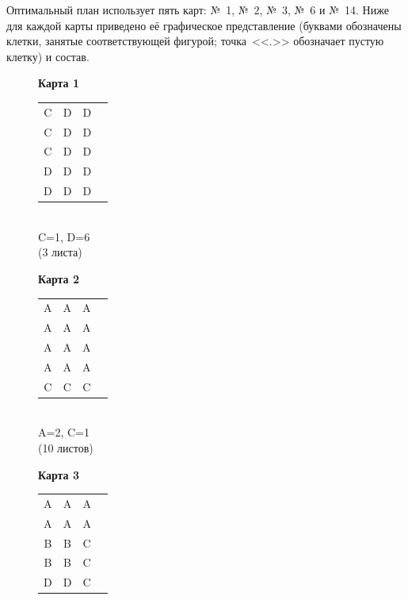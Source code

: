Оптимальный план использует пять карт: №~1, №~2, №~3, №~6 и №~14.
Ниже для каждой карты приведено её графическое представление
(буквами обозначены клетки, занятые соответствующей фигурой;
точка~<<.>> обозначает пустую клетку) и состав.

\clearpage

\begin{figure}[h!]
\centering

\begin{minipage}[t]{0.18\textwidth}
\centering
\textbf{Карта 1}\\[2mm]
{\ttfamily
\begin{tabular}{cccc}
C & D & D & \\
C & D & D & \\
C & D & D & \\
D & D & D & \\
D & D & D & \\
\end{tabular}
}\\[2mm]
\small C=1, D=6\\[1mm]
\small (3 листа)
\end{minipage}\hfill
\begin{minipage}[t]{0.18\textwidth}
\centering
\textbf{Карта 2}\\[2mm]
{\ttfamily
\begin{tabular}{cccc}
A & A & A & \\
A & A & A & \\
A & A & A & \\
A & A & A & \\
C & C & C & \\
\end{tabular}
}\\[2mm]
\small A=2, C=1\\[1mm]
\small (10 листов)
\end{minipage}\hfill
\begin{minipage}[t]{0.18\textwidth}
\centering
\textbf{Карта 3}\\[2mm]
{\ttfamily
\begin{tabular}{cccc}
A & A & A & \\
A & A & A & \\
B & B & C & \\
B & B & C & \\
D & D & C & \\
\end{tabular}
}\\[2mm]

\end{minipage}
\end{figure}

